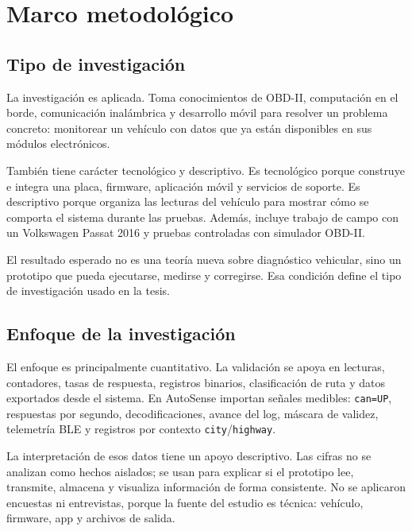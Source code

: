\documentclass[12pt,letterpaper]{report}
\begin{document}
\chapter{Marco metodológico}

\section{Tipo de investigación}

La investigación es aplicada. Toma conocimientos de OBD-II, computación en el borde, comunicación inalámbrica y desarrollo móvil para resolver un problema concreto: monitorear un vehículo con datos que ya están disponibles en sus módulos electrónicos.

También tiene carácter tecnológico y descriptivo. Es tecnológico porque construye e integra una placa, firmware, aplicación móvil y servicios de soporte. Es descriptivo porque organiza las lecturas del vehículo para mostrar cómo se comporta el sistema durante las pruebas. Además, incluye trabajo de campo con un Volkswagen Passat 2016 y pruebas controladas con simulador OBD-II.

El resultado esperado no es una teoría nueva sobre diagnóstico vehicular, sino un prototipo que pueda ejecutarse, medirse y corregirse. Esa condición define el tipo de investigación usado en la tesis.

\section{Enfoque de la investigación}

\label{sec:enfoque-investigacion}

El enfoque es principalmente cuantitativo. La validación se apoya en lecturas, contadores, tasas de respuesta, registros binarios, clasificación de ruta y datos exportados desde el sistema. En AutoSense importan señales medibles: \texttt{can=UP}, respuestas por segundo, decodificaciones, avance del log, máscara de validez, telemetría BLE y registros por contexto \texttt{city}/\texttt{highway}.

La interpretación de esos datos tiene un apoyo descriptivo. Las cifras no se analizan como hechos aislados; se usan para explicar si el prototipo lee, transmite, almacena y visualiza información de forma consistente. No se aplicaron encuestas ni entrevistas, porque la fuente del estudio es técnica: vehículo, firmware, app y archivos de salida.
\end{document}
